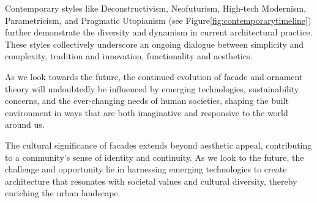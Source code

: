 Contemporary styles like Deconstructivism, Neofuturism, High-tech Modernism, Parametricism, and Pragmatic Utopianism (see Figure\ref{fig:contemporarytimeline}) further demonstrate the diversity and dynamism in current architectural practice.
These styles collectively underscore an ongoing dialogue between simplicity and complexity, tradition and innovation, functionality and aesthetics.

As we look towards the future, the continued evolution of facade and ornament theory will undoubtedly be influenced by emerging technologies, sustainability concerns, and the ever-changing needs of human societies, shaping the built environment in ways that are both imaginative and responsive to the world around us.

The cultural significance of facades extends beyond aesthetic appeal, contributing to a community's sense of identity and continuity.
As we look to the future, the challenge and opportunity lie in harnessing emerging technologies to create architecture that resonates with societal values and cultural diversity, thereby enriching the urban landscape.


